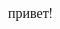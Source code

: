 \documentclass[a4paper, 12pt]{article}
\title{}
\author{}
\begin{document}
\maketitle
\abstract{}

привет!

\begin{thebibliography}{11}

\end{thebibliography}
\end{document}
